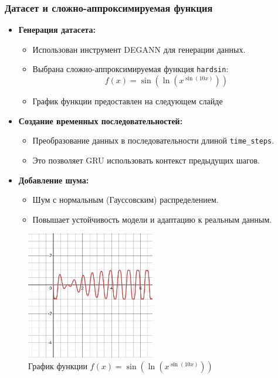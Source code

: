 \documentclass
  [ russian
  , aspectratio=1610 %
  ] {beamer}
\begin{document}
\begin{frame}
    \frametitle{Датасет и сложно-аппроксимируемая функция}
    \begin{itemize}
        \item \textbf{Генерация датасета:}
        \begin{itemize}
            \item Использован инструмент DEGANN для генерации данных.
            \item Выбрана сложно-аппроксимируемая функция \texttt{hardsin}:
            \[
            f(x) = \sin\left(\ln(x^{\sin(10x)})\right)
            \]
            \item График функции предоставлен на следующем слайде
        \end{itemize}
        \item \textbf{Создание временных последовательностей:}
        \begin{itemize}
            \item Преобразование данных в последовательности длиной \texttt{time\_steps}.
            \item Это позволяет GRU использовать контекст предыдущих шагов.
        \end{itemize}
        \item \textbf{Добавление шума:}
        \begin{itemize}
            \item Шум с нормальным (Гауссовским) распределением.
            \item Повышает устойчивость модели и адаптацию к реальным данным.
        \end{itemize}
    \end{itemize}
\end{frame}

\begin{frame}
\begin{figure}[H]
    \centering
    \includegraphics[width=0.5\textwidth]{figures/graph_hardsin.png}
    \caption{График функции $f(x) = \sin\left(\ln(x^{\sin(10x)})\right)$}
    \label{fig:hardsin_graph}
\end{figure}
\end{frame}
\end{document}
